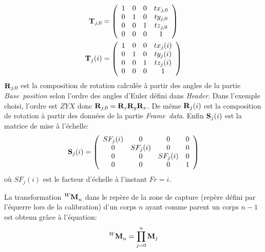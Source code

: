 \begin{align}
  \mbf{T}_{j,0} & = \left( \begin{array}{cccc}
    1 & 0 & 0 & tx_{j,0}\\
    0 & 1 & 0 & ty_{j,0}\\
    0 & 0 & 1 & tz_{j,0}\\
    0 & 0 & 0 & 1
		    \end{array}
	      \right)
  \label{eq:mocapTj0}\\
  \mbf{T}_j(i) & = \left( \begin{array}{cccc}
    1 & 0 & 0 & tx_j(i)\\
    0 & 1 & 0 & ty_j(i)\\
    0 & 0 & 1 & tz_j(i)\\
    0 & 0 & 0 & 1
		    \end{array}
	      \right)
  \label{eq:mocapTji}
\end{align}
\noindent ${\mathbf{R}}_{j,0}$ est la composition de rotation calculée à partir des angles de la partie
\emph{Base~position} selon l'ordre des angles d'Euler défini dans \emph{Header}. Dans
l'exemple choisi, l'ordre est $ZYX$
donc ${\mathbf{R}}_{j,0} = {\mathbf{R}}_z {\mathbf{R}}_y {\mathbf{R}}_x$. De même ${\mathbf{R}}_j(i)$ est la composition de rotation
à partir des données de la partie \emph{Frame~data}. Enfin ${\mathbf{S}}_j(i)$ est la matrice de mise à l'échelle:
\begin{equation}
  \mbf{S}_j(i) =  \left( \begin{array}{cccc}
		      SF_j(i) & 0 & 0 & 0\\
		      0 & SF_j(i) & 0 & 0\\
		      0 & 0 & SF_j(i) & 0\\
		      0 & 0 & 0 & 1
		    \end{array}
	      \right)  
  \label{eq:mocapSi}
\end{equation}
\noindent où $SF_j(i)$ est le facteur d'échelle à l'instant $Fr=i$.

La transformation $\tensor[^{W}]{\mathbf{M}}{_{n}}$ dans le repère de la zone de 
capture (repère défini par l'équerre lors de la calibration) d'un corps $n$ ayant comme parent
un corps $n-1$ est obtenu gr\^ace à l'équation:
\begin{equation}
  \tensor[^{W}]{\mathbf{M}}{_{n}} = \prod_{j=0}^{n} \mbf{M}_j
  \label{eq:globalMocap}
\end{equation}

\FloatBarrier
